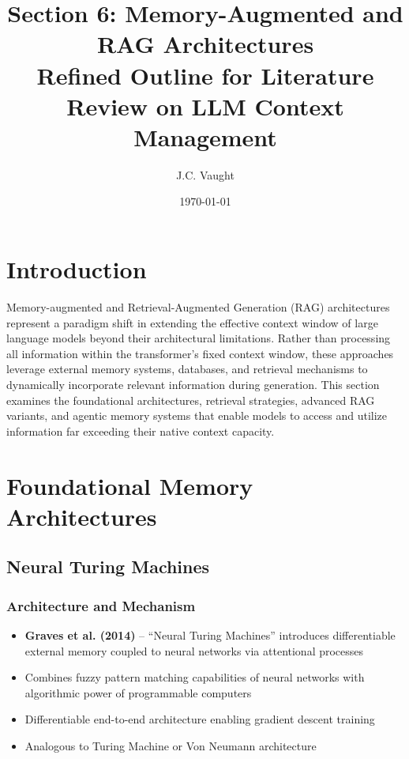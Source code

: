 \documentclass[11pt,letterpaper]{article}
\title{\textbf{Section 6: Memory-Augmented and RAG Architectures}\\
\large Refined Outline for Literature Review on LLM Context Management}
\author{J.C. Vaught}
\date{\today}
\begin{document}
\maketitle

\section{Introduction}

Memory-augmented and Retrieval-Augmented Generation (RAG) architectures represent a paradigm shift in extending the effective context window of large language models beyond their architectural limitations. Rather than processing all information within the transformer's fixed context window, these approaches leverage external memory systems, databases, and retrieval mechanisms to dynamically incorporate relevant information during generation. This section examines the foundational architectures, retrieval strategies, advanced RAG variants, and agentic memory systems that enable models to access and utilize information far exceeding their native context capacity.

\section{Foundational Memory Architectures}

\subsection{Neural Turing Machines}

\subsubsection{Architecture and Mechanism}
\begin{itemize}[leftmargin=*]
    \item \textbf{Graves et al. (2014)} -- ``Neural Turing Machines'' introduces differentiable external memory coupled to neural networks via attentional processes \cite{graves2014neural}
    \item Combines fuzzy pattern matching capabilities of neural networks with algorithmic power of programmable computers
    \item Differentiable end-to-end architecture enabling gradient descent training
    \item Analogous to Turing Machine or Von Neumann architecture
\end{itemize}
\end{document}
